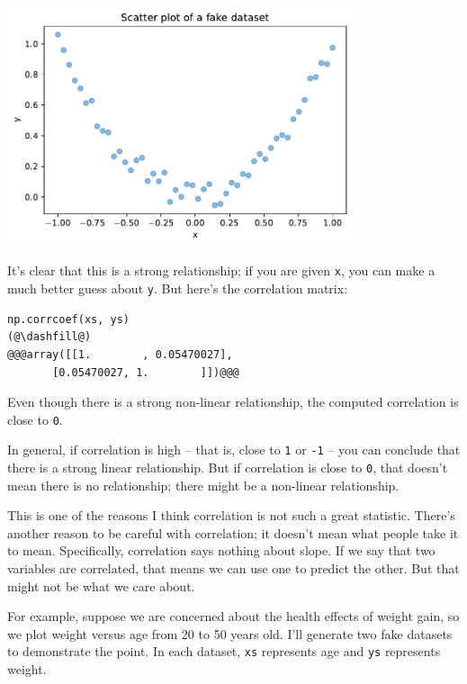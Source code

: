 \begin{center}
\includegraphics[width=4in]{chapters/09_relationships_files/09_relationships_61_0.pdf}
\end{center}

It's clear that this is a strong relationship; if you are given
\passthrough{\lstinline!x!}, you can make a much better guess about
\passthrough{\lstinline!y!}. But here's the correlation matrix:

\begin{lstlisting}[]
np.corrcoef(xs, ys)
(@\dashfill@)
@@@array([[1.        , 0.05470027],
       [0.05470027, 1.        ]])@@@
\end{lstlisting}

Even though there is a strong non-linear relationship, the computed
correlation is close to \passthrough{\lstinline!0!}.

In general, if correlation is high -- that is, close to
\passthrough{\lstinline!1!} or \passthrough{\lstinline!-1!} -- you can
conclude that there is a strong linear relationship. But if correlation
is close to \passthrough{\lstinline!0!}, that doesn't mean there is no
relationship; there might be a non-linear relationship.

This is one of the reasons I think correlation is not such a great
statistic. There's another reason to be careful with correlation; it
doesn't mean what people take it to mean. Specifically, correlation says
nothing about slope. If we say that two variables are correlated, that
means we can use one to predict the other. But that might not be what we
care about.

For example, suppose we are concerned about the health effects of weight
gain, so we plot weight versus age from 20 to 50 years old. I'll
generate two fake datasets to demonstrate the point. In each dataset,
\passthrough{\lstinline!xs!} represents age and
\passthrough{\lstinline!ys!} represents weight.

